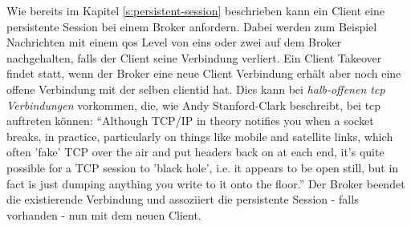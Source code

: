  \label{s:client-takeover}
Wie bereits im Kapitel \ref{s:persistent-session} beschrieben kann ein Client eine persistente Session bei einem Broker anfordern. Dabei werden zum Beispiel Nachrichten mit einem \ac{qos} Level von eins oder zwei auf dem Broker nachgehalten, falls der Client seine Verbindung verliert. Ein Client Takeover findet statt, wenn der Broker eine neue Client Verbindung erhält aber noch eine offene Verbindung mit der selben \ac{clientid} hat. Dies kann bei \textit{halb-offenen \acs{tcp} Verbindungen} vorkommen, die, wie Andy Stanford-Clark beschreibt, bei \ac{tcp} auftreten können:\newline
``Although TCP/IP in theory notifies you when a socket breaks, in practice, particularly on things like mobile and satellite links, which often 'fake' TCP over the air and put headers back on at each end, it’s quite possible for a TCP session to 'black hole', i.e. it appears to be open still, but in fact is just dumping anything you write to it onto the floor.''\cite{WhyKeepaliveNeeded}\newline
Der Broker beendet die existierende Verbindung und assoziiert die persistente Session - falls vorhanden - nun mit dem neuen Client.
\cite{teamKeepAliveClient}
\newpage

